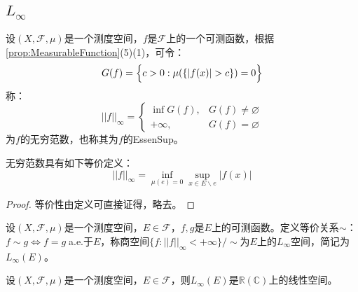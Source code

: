 \subsection{$L_{\infty}$}
\begin{definition}
	设$(X,\mathscr{F},\mu)$是一个测度空间，$f$是$\mathscr{F}$上的一个可测函数，根据\cref{prop:MeasurableFunction}(5)(1)，可令：
	\begin{equation*}
		G(f)=\Bigl\{c>0:\mu(\{|f(x)|>c\})=0\Bigr\}
	\end{equation*}
	称：
	\begin{equation*}
		||f||_{\infty}=
		\begin{cases}
			\inf G(f),&G(f)\ne\varnothing \\
			+\infty,&G(f)=\varnothing
		\end{cases}
	\end{equation*}
	为$f$的无穷范数，也称其为$f$的\gls{EssenSup}。
\end{definition}
\begin{theorem}
	无穷范数具有如下等价定义：
	\begin{equation*}
		||f||_\infty=\inf_{\mu(e)=0}\sup_{x\in E\backslash e}|f(x)|
	\end{equation*}
\end{theorem}
\begin{proof}
	等价性由定义可直接证得，略去。
\end{proof}
\begin{definition}
	设$(X,\mathscr{F},\mu)$是一个测度空间，$E\in\mathscr{F}$，$f,g$是$E$上的可测函数。定义等价关系$\sim$：$f\sim g\Leftrightarrow f=g\;$a.e.于$E$，称商空间$\{f:||f||_\infty<+\infty\}/\sim$为$E$上的$L_{\infty}$空间，简记为$L_{\infty}(E)$。
\end{definition}
\begin{property}\label{prop:Linfty}
	设$(X,\mathscr{F},\mu)$是一个测度空间，$E\in\mathscr{F}$，则$L_{\infty}(E)$是$\mathbb{R}(\mathbb{C})$上的线性空间。
\end{property}
